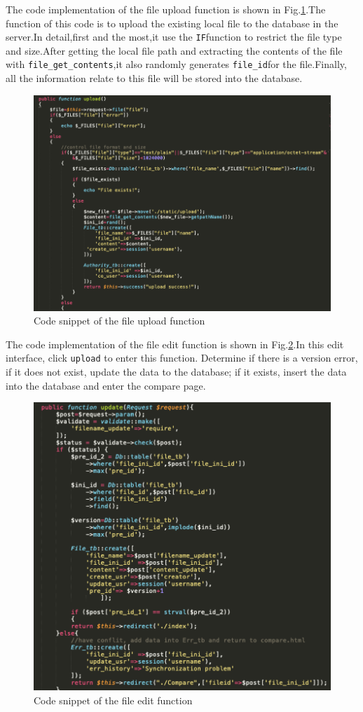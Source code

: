 \noindent The code implementation of the file upload function is shown in Fig.\ref{png4}.The function of this code is to upload the existing local file to the database in the server.In detail,first and the most,it use the \texttt{IF}function to restrict the file type and size.After getting the local file path and extracting the contents of the file with \texttt{file\_get\_contents},it also randomly generates \texttt{file\_id}for the file.Finally, all the information relate to this file will be stored into the database.
\begin{figure}[H]
  \centering
  \includegraphics[width=.8\textwidth]{upnowfile.png} %
  \caption{Code snippet of the file upload function} %
  \label{png4} %
\end{figure}


\noindent The code implementation of the file edit function is shown in Fig.\ref{png5}.In this edit interface, click \texttt{upload} to enter this function. Determine if there is a version error, if it does not exist, update the data to the database; if it exists, insert the data into the database and enter the compare page.

\begin{figure}[H]
  \centering
  \includegraphics[width=.8\textwidth]{edit.png} %
  \caption{Code snippet of the file edit function} %
  \label{png5} %
\end{figure}


